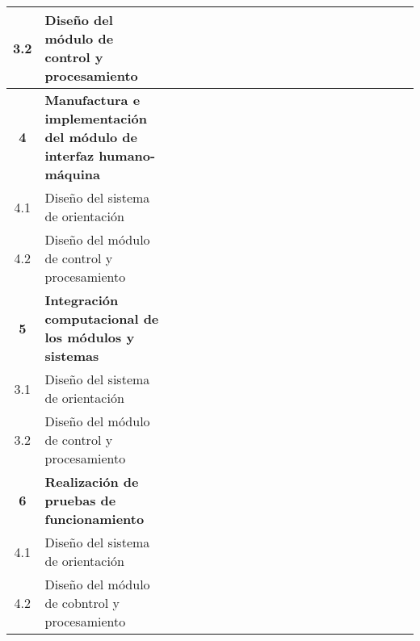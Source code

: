 \begin{table}[!ht]
{\begin{tabular}{clccccccccccccccccccc}
			3.2 & Diseño del módulo de control y procesamiento &  &  &  &  &  &  &  &  &  &  &  &  &  &  &  &  &  &  &  \\
			\midrule
			\textbf{4} & \textbf{Manufactura e implementación del módulo de interfaz humano-máquina} &  &  &  &  &  &  &  &  &  &  &  &  &  &  &  &  &  &  &  \\
			4.1 & Diseño del sistema de orientación &  &  &  &  &  &  &  &  &  &  &  &  &  &  &  &  &  &  &  \\
			4.2 & Diseño del módulo de control y procesamiento &  &  &  &  &  &  &  &  &  &  &  &  &  &  &  &  &  &  &  \\
			\midrule
			\textbf{5} & \textbf{Integración computacional de los módulos y sistemas} &  &  &  &  &  &  &  &  &  &  &  &  &  &  &  &  &  &  &  \\
			3.1 & Diseño del sistema de orientación &  &  &  &  &  &  &  &  &  &  &  &  &  &  &  &  &  &  &  \\
			3.2 & Diseño del módulo de control y procesamiento &  &  &  &  &  &  &  &  &  &  &  &  &  &  &  &  &  &  &  \\
			\midrule
			\textbf{6} & \textbf{Realización de pruebas de funcionamiento} &  &  &  &  &  &  &  &  &  &  &  &  &  &  &  &  &  &  &  \\
			4.1 & Diseño del sistema de orientación &  &  &  &  &  &  &  &  &  &  &  &  &  &  &  &  &  &  &  \\
			4.2 & Diseño del módulo de cobntrol y procesamiento &  &  &  &  &  &  &  &  &  &  &  &  &  &  &  &  &  &  &  \\ \bottomrule
		\end{tabular}
	}
\end{table}

